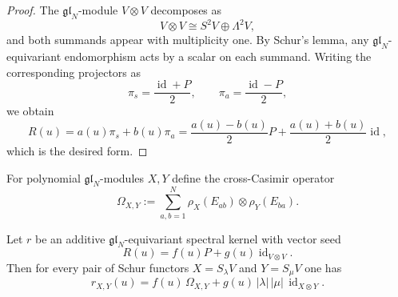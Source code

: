 \begin{proof}
The $\mathfrak{gl}_N$-module $V\otimes V$ decomposes as
\begin{equation}
V\otimes V\cong S^2V\oplus \Lambda^2V,
\end{equation}
and both summands appear with multiplicity one. By Schur's lemma, any
$\mathfrak{gl}_N$-equivariant endomorphism acts by a scalar on each
summand. Writing the corresponding projectors as
\begin{equation}
\pi_s=\frac{\operatorname{id}+P}{2},
\qquad
\pi_a=\frac{\operatorname{id}-P}{2},
\end{equation}
we obtain
\begin{equation}
R(u)=a(u)\pi_s+b(u)\pi_a
=\frac{a(u)-b(u)}{2}P+\frac{a(u)+b(u)}{2}\operatorname{id},
\end{equation}
which is the desired form.
\end{proof}

For polynomial $\mathfrak{gl}_N$-modules $X,Y$ define the cross-Casimir
operator
\begin{equation}
\Omega_{X,Y}:=\sum_{a,b=1}^N \rho_X(E_{ab})\otimes \rho_Y(E_{ba}).
\end{equation}

\begin{theorem}
\ClaimStatusProvedHere
\label{thm:schur-envelope-formula}
Let $r$ be an additive $\mathfrak{gl}_N$-equivariant spectral kernel with
vector seed
\begin{equation}
R(u)=f(u)P+g(u)\operatorname{id}_{V\otimes V}.
\end{equation}
Then for every pair of Schur functors $X=S_\lambda V$ and
$Y=S_\mu V$ one has
\begin{equation}
\label{eq:schur-envelope-formula}
r_{X,Y}(u)=f(u)\,\Omega_{X,Y}+g(u)\,|\lambda|\,|\mu|\,\operatorname{id}_{X\otimes Y}.
\end{equation}
\end{theorem}


